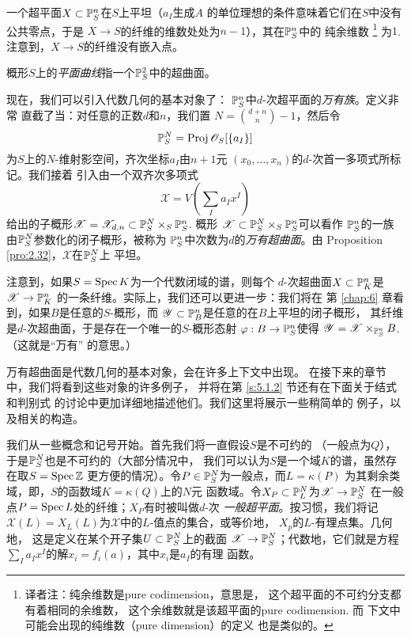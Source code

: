 
一个超平面$X\subset \P_S^n$在$S$上平坦（$a_I$生成$A$
的单位理想的条件意味着它们在$S$中没有公共零点，于是
$X\to S$的纤维的维数处处为$n-1$），其在$\P_S^n$中的
纯余维数%
\footnote{译者注：纯余维数是pure codimension，意思是，
这个超平面的不可约分支都有着相同的余维数，
这个余维数就是该超平面的pure codimension. 而
下文中可能会出现的纯维数（pure dimension）的定义
也是类似的。}%
为$1$. 注意到，$X\to S$的纤维没有嵌入点。

概形$S$上的\textit{平面曲线}指一个$\P_S^2$中的超曲面。

现在，我们可以引入代数几何的基本对象了：
$\P^n_S$中$d$-次超平面的\textit{万有族}。定义非常
直截了当：对任意的正数$d$和$n$，我们置
$N=\binom{d+n}{n}-1$，然后令
\[
	\P^N_S=\proj \oo_S[\{a_I\}]
\]
为$S$上的$N$-维射影空间，齐次坐标$a_I$由$n+1$元
$(x_0,\dots,x_n)$的$d$-次首一多项式所标记。我们接着
引入由一个双齐次多项式
\[
	\mathscr X=V\left(\sum_I a_I x^I\right)
\]
给出的子概形$\mathscr X=\mathscr X_{d,n}
\subset \P_S^N\times_S \P_S^n$. 概形
$\mathscr X\subset \P_S^N\times_S \P_S^n$可以看作
$\P_S^n$的一族由$\P_S^N$参数化的闭子概形，被称为
$\P_S^n$中次数为$d$的\textit{万有超曲面}。由
Proposition \ref{pro:2.32}，$\mathscr X$在$\P_S^N$上
平坦。

注意到，如果$S=\spec K$为一个代数闭域的谱，则每个
$d$-次超曲面$X\subset \P_K^n$是$\mathscr X\to \P_K^n$
的一条纤维。实际上，我们还可以更进一步：我们将在
第 \ref{chap:6} 章看到，如果$B$是任意的$S$-概形，而
$\mathscr Y\subset \P_B^n$是任意的在$B$上平坦的闭子概形，
其纤维是$d$-次超曲面，于是存在一个唯一的$S$-概形态射
$\varphi:B\to \P_S^n$使得
$\mathscr Y=\mathscr X\times_{\P_S^n}B$. （这就是“万有”
的意思。）

万有超曲面是代数几何的基本对象，会在许多上下文中出现。
在接下来的章节中，我们将看到这些对象的许多例子，
并将在第 \ref{s:5.1.2} 节还有在下面关于结式和判别式
的讨论中更加详细地描述他们。我们这里将展示一些稍简单的
例子，以及相关的构造。

我们从一些概念和记号开始。首先我们将一直假设$S$是不可约的
（一般点为$Q$），于是$\P_S^N$也是不可约的（大部分情况中，
我们可以认为$S$是一个域$K$的谱，虽然存在取$S=\spec \zz$
更方便的情况）。令$P\in \P_S^N$为一般点，而$L=\kappa(P)$
为其剩余类域，即，$S$的函数域$K=\kappa(Q)$上的$N$元
函数域。令$X_P\subset \P_L^N$为$\mathscr X\to \P_S^N$
在一般点$P=\spec L$处的纤维；$X_P$有时被叫做$d$-次
\textit{一般超平面}。按习惯，我们将记$\mathscr X(L)
=X_L(L)$为$\mathscr X$中的$L$-值点的集合，或等价地，
$X_p$的$L$-有理点集。几何地，%
这是定义在某个开子集$U\subset \P_S^N$上的截面
$\mathscr X\to \P_S^N$；代数地，它们就是方程
$\sum_I a_Ix^I$的解$x_i=f_i(a)$，其中$x_i$是$a_I$的有理
函数。

